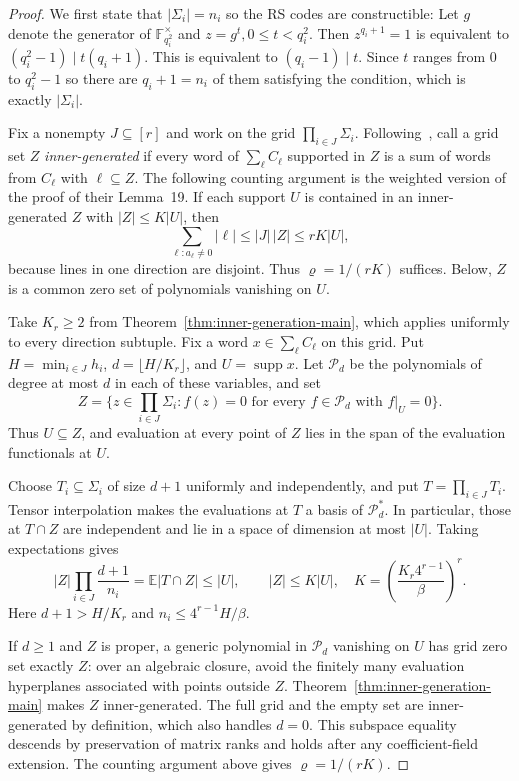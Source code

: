 \documentclass[11pt,letterpaper]{article}
\renewcommand{\leq}{\leqslant}
\renewcommand{\le}{\leqslant}
\renewcommand{\ge}{\geqslant}
\theoremstyle{definition}
\theoremstyle{remark}
\newcommand{\supp}{\operatorname{supp}}
\begin{document}
\begin{proof}
We first state that $|\Sigma_i|=n_i$ so the RS codes are constructible: Let $g$ denote the generator of $\mathbb{F}^{\times}_{q^2_i}$ and $z=g^t,0\leq t<q^2_i$. Then $z^{q_i+1}=1$ is equivalent to $(q^2_i-1)\mid t(q_i+1)$. This is equivalent to $(q_i-1)\mid t$. Since $t$ ranges from $0$ to $q^2_i-1$ so there are $q_i+1=n_i$ of them satisfying the condition, which is exactly $|\Sigma_i|$. 

Fix a nonempty $J\subseteq[r]$ and work on the grid
$\prod_{i\in J}\Sigma_i$.
Following~\cite[Definition~5]{KalachevPanteleev2025}, call a grid
set $Z$ \emph{inner-generated} if every word of $\sum_\ell C_\ell$
supported in $Z$ is a sum of words from $C_\ell$ with $\ell\subseteq Z$.
The following counting argument is the weighted version of
the proof of their Lemma~19. If each support $U$ is contained in an
inner-generated $Z$ with $|Z|\le K|U|$, then
\[
 \sum_{\ell:a_\ell\ne0}|\ell|\le |J|\,|Z|\le rK|U|,
\]
because lines in one direction are disjoint. Thus $\varrho=1/(rK)$
suffices. Below, $Z$ is a common zero set of polynomials vanishing on $U$.

Take $K_r\ge2$ from Theorem~\ref{thm:inner-generation-main}, which applies
uniformly to every direction subtuple. Fix a word
$x\in\sum_\ell C_\ell$ on this grid. Put
$H=\min_{i\in J}h_i$, $d=\lfloor H/K_r\rfloor$, and
$U=\supp x$. Let $\mathcal P_d$ be the polynomials of degree
at most $d$ in each of these variables, and set
\[
 Z=\{z\in\textstyle\prod_{i\in J}\Sigma_i:
          f(z)=0\text{ for every }f\in\mathcal P_d
          \text{ with }f|_U=0\}.
\]
Thus $U\subseteq Z$, and evaluation at every point of $Z$ lies
in the span of the evaluation functionals at $U$.

Choose $T_i\subseteq\Sigma_i$ of size $d+1$ uniformly and
independently, and put $T=\prod_{i\in J}T_i$.
Tensor interpolation makes the evaluations at $T$ a basis of
$\mathcal P_d^*$. In particular, those at $T\cap Z$ are
independent and lie in a space of dimension at most $|U|$.
Taking expectations gives
\[
 |Z|\prod_{i\in J}\frac{d+1}{n_i}
   =\mathbb E|T\cap Z|\le|U|,
 \qquad
 |Z|\le K|U|,\quad
 K=\left(\frac{K_r4^{r-1}}{\beta}\right)^r.
\]
Here $d+1>H/K_r$ and $n_i\le 4^{r-1}H/\beta$.

If $d\ge1$ and $Z$ is proper, a generic polynomial in
$\mathcal P_d$ vanishing on $U$ has grid zero set exactly $Z$:
over an algebraic closure, avoid the finitely many evaluation
hyperplanes associated with points outside $Z$.
Theorem~\ref{thm:inner-generation-main} makes $Z$ inner-generated.
The full grid and the empty set are inner-generated by
definition, which also handles $d=0$. This subspace equality
descends by preservation of matrix ranks and holds after any
coefficient-field extension. The counting argument above
gives $\varrho=1/(rK)$.
\end{proof}
\end{document}

